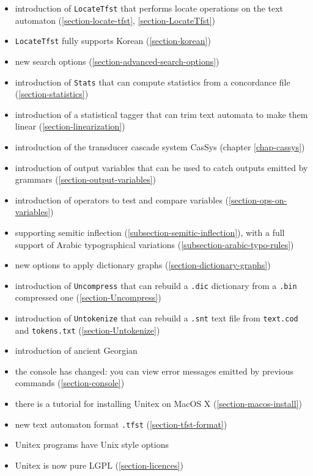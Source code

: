 \begin{itemize}
  \item introduction of \verb$LocateTfst$ that performs locate operations
        on the text automaton (\ref{section-locate-tfst}, \ref{section-LocateTfst})
  \item \verb$LocateTfst$ fully supports Korean (\ref{section-korean})
  \item new search options (\ref{section-advanced-search-options})
  \item introduction of \verb$Stats$ that can compute statistics from a
        concordance file (\ref{section-statistics})
  \item introduction of a statistical tagger that can trim text automata to make them
        linear (\ref{section-linearization})
  \item introduction of the transducer cascade system CasSys (chapter \ref{chap-cassys})
  \item introduction of output variables that can be used to catch outputs emitted
        by grammars (\ref{section-output-variables})
  \item introduction of operators to test and compare variables (\ref{section-ops-on-variables})
  \item supporting semitic inflection (\ref{subsection-semitic-inflection}), with a full support 
        of Arabic typographical variations (\ref{subsection-arabic-typo-rules})
  \item new options to apply dictionary graphs (\ref{section-dictionary-graphs}) 
  \item introduction of \verb$Uncompress$ that can rebuild a \verb$.dic$
        dictionary from a \verb$.bin$ compressed one (\ref{section-Uncompress})
  \item introduction of \verb$Untokenize$ that can rebuild a \verb$.snt$
        text file from \verb$text.cod$ and \verb$tokens.txt$ (\ref{section-Untokenize})
  \item introduction of ancient Georgian
  \item the console has changed: you can view error messages emitted by
        previous commands (\ref{section-console})
  \item there is a tutorial for installing Unitex on MacOS X 
       (\ref{section-macos-install})
  \item new text automaton format \verb+.tfst+ (\ref{section-tfst-format})          
  \item Unitex programs have Unix style options
  \item Unitex is now pure LGPL (\ref{section-licences})

\end{itemize}
